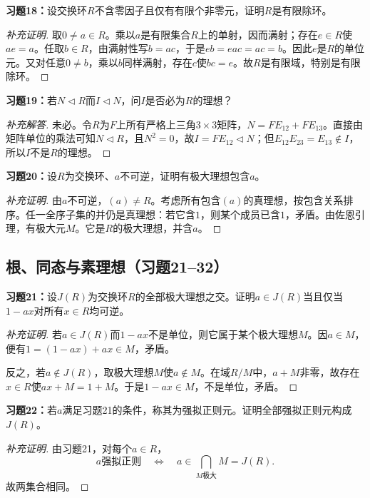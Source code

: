\begin{problem}
\textbf{习题18：}设交换环$R$不含零因子且仅有有限个非零元，证明$R$是有限除环。
\end{problem}
\begin{proof}[补充证明]
取$0\ne a\in R$。乘以$a$是有限集合$R$上的单射，因而满射；存在$e\in R$使$ae=a$。任取$b\in R$，由满射性写$b=ac$，于是$eb=eac=ac=b$。因此$e$是$R$的单位元。又对任意$0\ne b$，乘以$b$同样满射，存在$c$使$bc=e$。故$R$是有限域，特别是有限除环。
\end{proof}

\begin{problem}
\textbf{习题19：}若$N\lhd R$而$I\lhd N$，问$I$是否必为$R$的理想？
\end{problem}
\begin{proof}[补充解答]
未必。令$R$为$F$上所有严格上三角$3\times3$矩阵，$N=F E_{12}+F E_{13}$。直接由矩阵单位的乘法可知$N\lhd R$，且$N^2=0$，故$I=F E_{12}\lhd N$；但$E_{12}E_{23}=E_{13}\notin I$，所以$I$不是$R$的理想。
\end{proof}

\begin{problem}
\textbf{习题20：}设$R$为交换环、$a$不可逆，证明有极大理想包含$a$。
\end{problem}
\begin{proof}[补充证明]
由$a$不可逆，$(a)\ne R$。考虑所有包含$(a)$的真理想，按包含关系排序。任一全序子集的并仍是真理想：若它含$1$，则某个成员已含$1$，矛盾。由佐恩引理，有极大元$M$。它是$R$的极大理想，并含$a$。
\end{proof}

\subsection*{根、同态与素理想（习题21--32）}

\begin{problem}
\textbf{习题21：}设$J(R)$为交换环$R$的全部极大理想之交。证明$a\in J(R)$当且仅当$1-ax$对所有$x\in R$均可逆。
\end{problem}
\begin{proof}[补充证明]
若$a\in J(R)$而$1-ax$不是单位，则它属于某个极大理想$M$。因$a\in M$，便有$1=(1-ax)+ax\in M$，矛盾。

反之，若$a\notin J(R)$，取极大理想$M$使$a\notin M$。在域$R/M$中，$a+M$非零，故存在$x\in R$使$ax+M=1+M$。于是$1-ax\in M$，不是单位，矛盾。
\end{proof}

\begin{problem}
\textbf{习题22：}若$a$满足习题21的条件，称其为强拟正则元。证明全部强拟正则元构成$J(R)$。
\end{problem}
\begin{proof}[补充证明]
由习题21，对每个$a\in R$，
\[
a\text{强拟正则}\quad\Longleftrightarrow\quad a\in\bigcap_{M\text{极大}}M=J(R).
\]
故两集合相同。
\end{proof}

